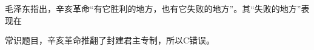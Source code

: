 \question 毛泽东指出，辛亥革命``有它胜利的地方，也有它失败的地方''。其``失败的地方''表现在
\par{}
\begin{solution}常识题目，辛亥革命推翻了封建君主专制，所以C错误。
\end{solution}
